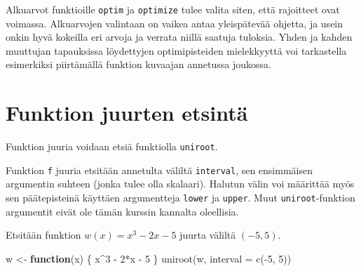 \documentclass[
]{book}
\newenvironment{Shaded}{\begin{snugshade}}{\end{snugshade}}
\newcommand{\AttributeTok}[1]{\textcolor[rgb]{0.77,0.63,0.00}{#1}}
\newcommand{\ConstantTok}[1]{\textcolor[rgb]{0.00,0.00,0.00}{#1}}
\newcommand{\ControlFlowTok}[1]{\textcolor[rgb]{0.13,0.29,0.53}{\textbf{#1}}}
\newcommand{\DecValTok}[1]{\textcolor[rgb]{0.00,0.00,0.81}{#1}}
\newcommand{\FloatTok}[1]{\textcolor[rgb]{0.00,0.00,0.81}{#1}}
\newcommand{\FunctionTok}[1]{\textcolor[rgb]{0.00,0.00,0.00}{#1}}
\newcommand{\NormalTok}[1]{#1}
\newcommand{\OtherTok}[1]{\textcolor[rgb]{0.56,0.35,0.01}{#1}}
\newcommand{\SpecialCharTok}[1]{\textcolor[rgb]{0.00,0.00,0.00}{#1}}
\newcommand{\StringTok}[1]{\textcolor[rgb]{0.31,0.60,0.02}{#1}}
\begin{document}
Alkuarvot funktioille \texttt{optim} ja \texttt{optimize} tulee valita siten, että rajoitteet ovat voimassa. Alkuarvojen valintaan on vaikea antaa yleispätevää ohjetta, ja usein onkin hyvä kokeilla eri arvoja ja verrata niillä saatuja tuloksia. Yhden ja kahden muuttujan tapauksissa löydettyjen optimipisteiden mielekkyyttä voi tarkastella esimerkiksi piirtämällä funktion kuvaajan annetussa joukossa.

\hypertarget{funktion-juurten-etsintuxe4}{%
\section{Funktion juurten etsintä}\label{funktion-juurten-etsintuxe4}}

Funktion juuria voidaan etsiä funktiolla \texttt{uniroot}.

\begin{Shaded}
\end{Shaded}

Funktion \texttt{f} juuria etsitään annetulta väliltä \texttt{interval}, sen ensimmäisen argumentin suhteen (jonka tulee olla skalaari). Halutun välin voi määrittää myös sen päätepisteinä käyttäen argumentteja \texttt{lower} ja \texttt{upper}. Muut \texttt{uniroot}-funktion argumentit eivät ole tämän kurssin kannalta oleellisia.

Etsitään funktion \(w(x)=x^3-2x-5\) juurta väliltä \((-5,5)\).

\begin{Shaded}
\begin{Highlighting}[]
\NormalTok{w }\OtherTok{\textless{}{-}} \ControlFlowTok{function}\NormalTok{(x) \{ x}\SpecialCharTok{\^{}}\DecValTok{3} \SpecialCharTok{{-}} \DecValTok{2}\SpecialCharTok{*}\NormalTok{x }\SpecialCharTok{{-}} \DecValTok{5}\NormalTok{ \}}
\FunctionTok{uniroot}\NormalTok{(w, }\AttributeTok{interval =} \FunctionTok{c}\NormalTok{(}\SpecialCharTok{{-}}\DecValTok{5}\NormalTok{, }\DecValTok{5}\NormalTok{))}
\end{Highlighting}
\end{Shaded}
\end{document}
